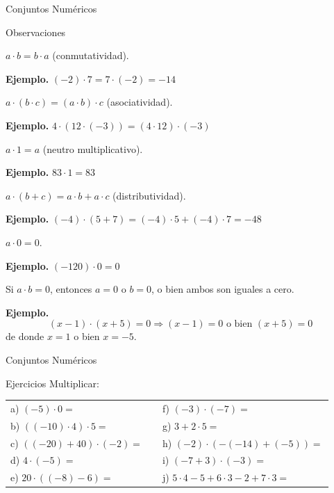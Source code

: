 \documentclass[aspectratio=169,handout,11pt]{beamer}
\begin{document}
	\begin{frame}{Conjuntos Numéricos}
		\begin{block}{Observaciones}
			\begin{enumerate} \small{
				\item $a\cdot b=b\cdot a$ (conmutatividad).
				
				\textbf{Ejemplo.} $(-2)\cdot 7=7\cdot (-2)=-14$
				\pause
				
				\item $a\cdot (b\cdot c)=(a\cdot b)\cdot c$ (asociatividad).
				
				\textbf{Ejemplo.} $4\cdot(12\cdot(-3))=(4\cdot12)\cdot(-3)$
				\pause
				
				\item $a\cdot1=a$ (neutro multiplicativo).
				
				\textbf{Ejemplo.} $83\cdot1=83$
				\pause
				
				\item $a\cdot(b+c)=a\cdot b+a\cdot c$ (distributividad).
				
				\textbf{Ejemplo.} $(-4)\cdot(5+7)=(-4)\cdot5+(-4)\cdot7=-48$
				\pause
				
				\item $a\cdot0=0$.
				
				\textbf{Ejemplo.} $(-120)\cdot0=0$
				\pause
				
				\item Si $a\cdot b=0$, entonces $a=0$ o $b=0$, o bien ambos son iguales a cero.
				
				\textbf{Ejemplo.}
				\[
				(x-1)\cdot(x+5)=0 \Longrightarrow (x-1)=0 \text{ o bien } (x+5)=0
				\]
				de donde $x=1$ o bien $x=-5$.}
			\end{enumerate}
		\end{block}
	\end{frame}
	
	\begin{frame}{Conjuntos Numéricos}
		\begin{block}{Ejercicios}
			Multiplicar:
			
			\begin{tabular}{lll}
				a) $(-5)\cdot0=$\pause &  & f) $(-3)\cdot(-7)=$\pause \\
				b) $((-10)\cdot4)\cdot5=$\pause &  & g) $3+2\cdot5=$\pause \\
				c) $((-20)+40)\cdot(-2)=$\pause &  & h) $(-2)\cdot(-(-14)+(-5))=$\pause \\
				d) $4\cdot(-5)=$\pause &  & i) $(-7+3)\cdot(-3)=$\pause \\
				e) $20\cdot((-8)-6)=$\pause &  & j) $5\cdot4-5+6\cdot3-2+7\cdot3=$
			\end{tabular}
		\end{block}
	\end{frame}
	
\end{document}
